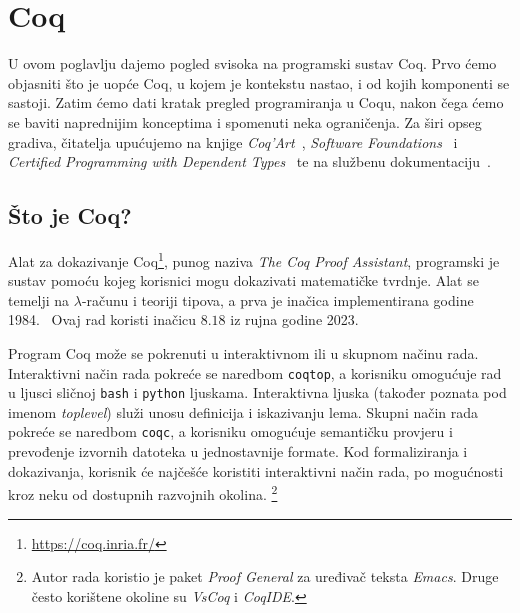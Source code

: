 \chapter{Coq}\label{pog:glavni_dio}
U ovom poglavlju dajemo pogled svisoka na programski sustav Coq.
Prvo ćemo objasniti što je uopće Coq, u kojem je kontekstu nastao, i od kojih komponenti se sastoji.
Zatim ćemo dati kratak pregled programiranja u Coqu, nakon čega ćemo se baviti naprednijim konceptima i spomenuti neka ograničenja.
Za širi opseg gradiva, čitatelja upućujemo na knjige \textit{Coq'Art}~\cite{coqart}, \textit{Software Foundations}~\cite{sf-lf, sf-plf, sf-vfa} i \textit{Certified Programming with Dependent Types}~\cite{cpdt} te na službenu dokumentaciju~\cite{coqrefman}.

\section{Što je Coq?}\label{sec:osnovno-o-coqu}
Alat za dokazivanje Coq\footnote{\url{https://coq.inria.fr/}}, punog naziva \textit{The Coq Proof Assistant},
programski je sustav pomoću kojeg korisnici mogu dokazivati matematičke tvrdnje. 
Alat se temelji na \(\lambda\)-računu i teoriji tipova, a prva je inačica implementirana godine 1984.~\cite{coqrefman}
Ovaj rad koristi inačicu \(8.18\) iz rujna godine 2023.

Program Coq može se pokrenuti u interaktivnom ili u skupnom načinu rada.
Interaktivni način rada pokreće se naredbom \texttt{coqtop}, a korisniku omogućuje rad u ljusci sličnoj \texttt{bash} i \texttt{python} ljuskama.
Interaktivna ljuska (također poznata pod imenom \textit{toplevel}) služi unosu definicija i iskazivanju lema.
Skupni način rada pokreće se naredbom \texttt{coqc}, a korisniku omogućuje semantičku provjeru i prevođenje izvornih datoteka u jednostavnije formate.
Kod formaliziranja i dokazivanja, korisnik će najčešće koristiti interaktivni način rada, po mogućnosti kroz neku od dostupnih razvojnih okolina.
\footnote{Autor rada koristio je paket \textit{Proof General} za uređivač teksta \textit{Emacs}. Druge često korištene okoline su \textit{VsCoq} i \textit{CoqIDE}.}


